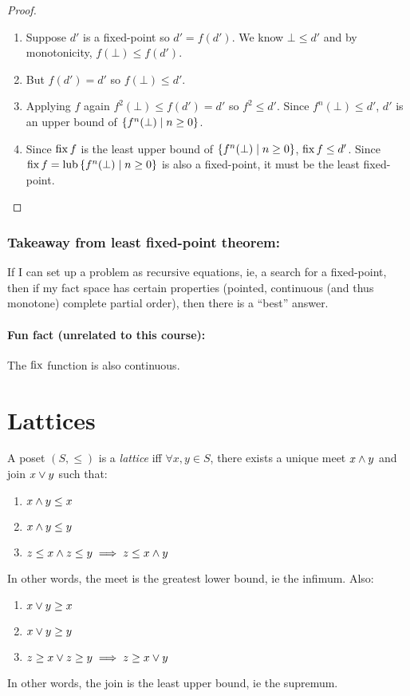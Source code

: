 \documentclass{article}
\begin{document}
\begin{proof}
\begin{enumerate}
  \begin{enumerate}
  \item Suppose $d'$ is a fixed-point so $d' = f(d')$. We know $\bot\leq d'$
    and by monotonicity, $f(\bot)\leq f(d')$.  
  \item But $f(d') = d'$ so $f(\bot)\leq d'$.
  \item Applying $f$ again $f^2(\bot)\leq f(d') = d'$ so $f^2\leq d'$. Since
    $f^n(\bot)\leq d'$, $d'$ is an upper bound of $\{f^n(\bot)\mid n\geq 0\}$.
  \item Since $\operatorname{fix}{f}$ is the least upper bound of $\{f^n(\bot)\mid n\geq 0\}$, $\operatorname{fix}{f}\leq
    d'$. Since $\operatorname{fix}{f} = \operatorname{lub}{\{f^n(\bot)\mid n\geq 0\}}$ is also a fixed-point, it must be the
    least fixed-point.
  \end{enumerate}
\end{enumerate}
\end{proof}

\subsubsection*{Takeaway from least fixed-point theorem:}
If I can set up a problem as recursive equations, ie, a search for a
fixed-point, then if my fact space has certain properties (pointed, continuous
(and thus monotone) complete partial order), then there is a ``best'' answer.

\paragraph{Fun fact (unrelated to this course):} The $\operatorname{fix}$ function is also continuous.

\section{Lattices}
\begin{definition}\label{def:lattice}
  A poset $(S,\leq)$ is a \emph{lattice} iff $\forall x,y\in S$, there exists a
  unique meet $x\wedge y$ and join $x\vee y$ such that:
  \begin{enumerate}
    \item $x\wedge y\leq x$
    \item $x\wedge y\leq y$
    \item $z\leq x\wedge z\leq y\implies z\leq x\wedge y$
  \end{enumerate}
  In other words, the meet is the greatest lower bound, ie the infimum. Also:
  \begin{enumerate}
    \item $x\vee y\geq x$
    \item $x\vee y\geq y$
    \item $z\geq x\vee z\geq y\implies z\geq x\vee y$
  \end{enumerate}
  In other words, the join is the least upper bound, ie the supremum.
\end{definition}
\end{document}
